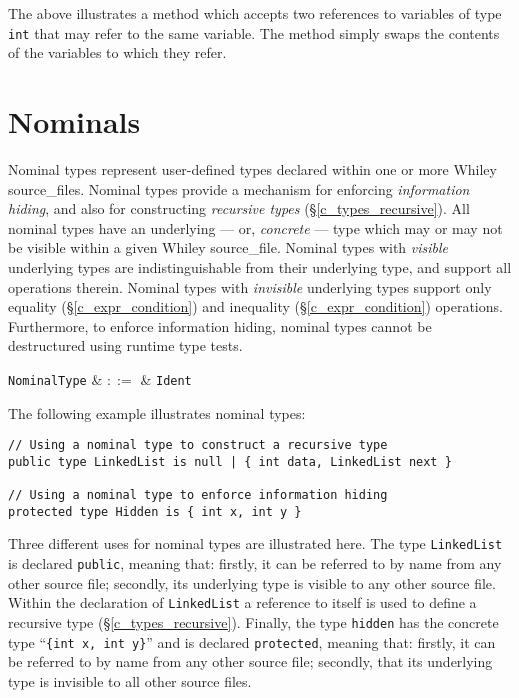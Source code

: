 The above illustrates a method which accepts two references to variables of type \lstinline{int} that may refer to the same variable.  The method simply swaps the contents of the variables to which they refer.


\section{Nominals}
\label{c_types_nominal}

Nominal types represent user-defined types declared within one or more Whiley \gls{source_file}s.  Nominal types provide a mechanism for enforcing {\em information hiding}, and also for constructing {\em recursive types} (\S\ref{c_types_recursive}).  All nominal types have an underlying --- or, {\em concrete} --- type which may or may not be visible within a given Whiley \gls{source_file}.  Nominal types with {\em visible} underlying types are indistinguishable from their underlying type, and support all operations therein.   Nominal types with {\em invisible} underlying types support only equality (\S\ref{c_expr_condition}) and inequality (\S\ref{c_expr_condition}) operations.  Furthermore, to enforce information hiding, nominal types cannot be destructured using runtime type tests.

\begin{syntax}
  \verb+NominalType+ & $::=$ & \verb+Ident+\\
\end{syntax}

\noindent The following example illustrates nominal types:
\begin{lstlisting}
// Using a nominal type to construct a recursive type
public type LinkedList is null | { int data, LinkedList next }

// Using a nominal type to enforce information hiding
protected type Hidden is { int x, int y }
\end{lstlisting}
Three different uses for nominal types are illustrated here.  The type \lstinline{LinkedList} is declared \lstinline{public}, meaning that: firstly, it can be referred to by name from any other source file; secondly, its underlying type is visible to any other source file.  Within the declaration of \lstinline{LinkedList} a reference to itself is used to define a recursive type (\S\ref{c_types_recursive}).  Finally, the type \lstinline{hidden} has the concrete type ``\lstinline|{int x, int y}|'' and is declared \lstinline{protected}, meaning that: firstly, it can be referred to by name from any other source file; secondly,  that its underlying type is invisible to all other source files.

